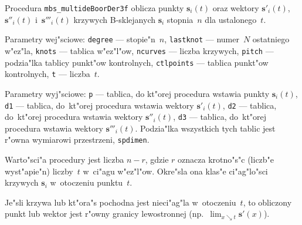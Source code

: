 \newpage
\begin{sloppypar}
Procedura \texttt{mbs\_multideBoorDer3f} oblicza punkty $\bm{s}_i(t)$ oraz
wektory $\bm{s}'_i(t)$, $\bm{s}''_i(t)$ i~$\bm{s}'''_i(t)$ krzywych
B-sklejanych $\bm{s}_i$ stopnia~$n$ dla ustalonego~$t$.
\end{sloppypar}

Parametry wej"sciowe: \texttt{degree} --- stopie"n~$n$,
\texttt{lastknot} --- numer~$N$ ostatniego w"ez"la,
\texttt{knots} --- tablica w"ez"l"ow, \texttt{ncurves}
--- liczba krzywych, \texttt{pitch} --- podzia"lka tablicy punkt"ow
kontrolnych, \texttt{ctlpoints} --- tablica punkt"ow kontrolnych,
\texttt{t} --- liczba~$t$.

Parametry wyj"sciowe: \texttt{p} --- tablica, do kt"orej procedura wstawia
punkty $\bm{s}_i(t)$, \texttt{d1} --- tablica, do~kt"orej procedura wstawia
wektory $\bm{s}'_i(t)$, \texttt{d2} --- tablica, do~kt"orej procedura
wstawia wektory $\bm{s}''_i(t)$, \texttt{d3} --- tablica, do~kt"orej procedura
wstawia wektory $\bm{s}'''_i(t)$. Podzia"lka wszystkich tych tablic jest
r"owna wymiarowi przestrzeni, \texttt{spdimen}.

Warto"sci"a procedury jest liczba $n-r$, gdzie $r$ oznacza krotno"s"c
(liczb"e wyst"apie"n) liczby~$t$ w~ci"agu w"ez"l"ow. Okre"sla ona klas"e
ci"ag"lo"sci krzywych $\bm{s}_i$ w~otoczeniu punktu~$t$.

Je"sli krzywa lub kt"ora"s pochodna jest nieci"ag"la w~otoczeniu~$t$, to
obliczony punkt lub wektor jest r"owny granicy lewostronnej (np.\
$\lim_{x\searrow t}\bm{s}'(x)$).

